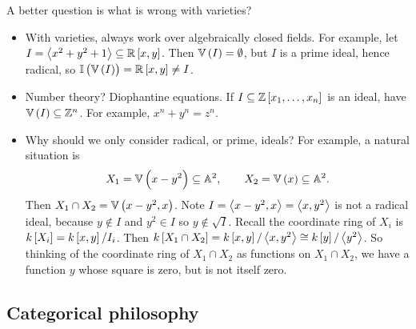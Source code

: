 A better question is what is wrong with varieties?
\begin{itemize}
\item With varieties, always work over algebraically closed fields. For example, let $ I = \abr{x^2 + y^2 + 1} \subseteq \RR\sbr{x, y} $. Then $ \VV\br{I} = \emptyset $, but $ I $ is a prime ideal, hence radical, so $ \II\br{\VV\br{I}} = \RR\sbr{x, y} \ne I $.
\item Number theory? Diophantine equations. If $ I \subseteq \ZZ\sbr{x_1, \dots, x_n} $ is an ideal, have $ \VV\br{I} \subseteq \ZZ^n $. For example, $ x^n + y^n = z^n $.
\item Why should we only consider radical, or prime, ideals? For example, a natural situation is
$$ X_1 = \VV\br{x - y^2} \subseteq \AA^2, \qquad X_2 = \VV\br{x} \subseteq \AA^2. $$
Then $ X_1 \cap X_2 = \VV\br{x - y^2, x} $. Note $ I = \left\langle x - y^2, x \right\rangle = \left\langle x, y^2 \right\rangle $ is not a radical ideal, because $ y \notin I $ and $ y^2 \in I $ so $ y \not\in \sqrt{I} $. Recall the coordinate ring of $ X_i $ is $ k\sbr{X_i} = k\sbr{x, y} / I_i $. Then $ k\sbr{X_1 \cap X_2} = k\sbr{x, y} / \abr{x, y^2} \cong k\sbr{y} / \abr{y^2} $. So thinking of the coordinate ring of $ X_1 \cap X_2 $ as functions on $ X_1 \cap X_2 $, we have a function $ y $ whose square is zero, but is not itself zero.
\end{itemize}

\pagebreak

\subsection{Categorical philosophy}

